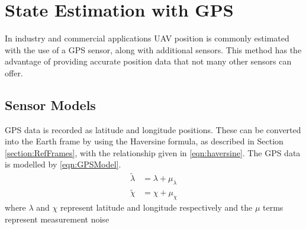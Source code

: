 \section{State Estimation with GPS}\label{section:GPS_EKF}
In industry and commercial applications UAV position is commonly estimated with the use of a GPS sensor, along with additional sensors. This method has the advantage of providing accurate position data that not many other sensors can offer.

\subsection{Sensor Models}\label{section:GPS_sensorModels}
GPS data is recorded as latitude and longitude positions. These can be converted into the Earth frame by using the Haversine formula, as described in Section \ref{section:RefFrames}, with the relationship given in \eqref{eqn:haversine}. The GPS data is modelled by \eqref{eqn:GPSModel}.
\begin{equation}\label{eqn:GPSModel}
\begin{split}
\tilde{\lambda}&=\lambda+\mu_{\lambda}\\
\tilde{\chi}&=\chi +\mu_{\chi}
\end{split}
\end{equation}
where $\lambda$ and $\chi$ represent latitude and longitude respectively and the $\mu$ terms represent measurement noise

